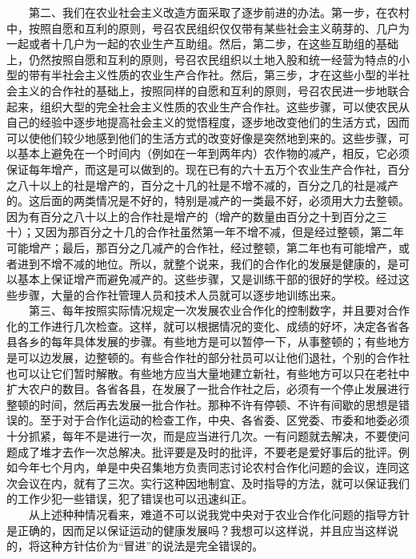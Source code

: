 \documentclass[cn,11pt,chinese]{elegantbook}
\begin{document}
　　第二、我们在农业社会主义改造方面采取了逐步前进的办法。第一步，在农村中，按照自愿和互利的原则，号召农民组织仅仅带有某些社会主义萌芽的、几户为一起或者十几户为一起的农业生产互助组。然后，第二步，在这些互助组的基础上，仍然按照自愿和互利的原则，号召农民组织以土地入股和统一经营为特点的小型的带有半社会主义性质的农业生产合作社。然后，第三步，才在这些小型的半社会主义的合作社的基础上，按照同样的自愿和互利的原则，号召农民进一步地联合起来，组织大型的完全社会主义性质的农业生产合作社。这些步骤，可以使农民从自己的经验中逐步地提高社会主义的觉悟程度，逐步地改变他们的生活方式，因而可以使他们较少地感到他们的生活方式的改变好像是突然地到来的。这些步骤，可以基本上避免在一个时间内（例如在一年到两年内）农作物的减产，相反，它必须保证每年增产，而这是可以做到的。现在已有的六十五万个农业生产合作社，百分之八十以上的社是增产的，百分之十几的社是不增不减的，百分之几的社是减产的。这后面的两类情况是不好的，特别是减产的一类最不好，必须用大力去整顿。因为有百分之八十以上的合作社是增产的（增产的数量由百分之十到百分之三十）；又因为那百分之十几的合作社虽然第一年不增不减，但是经过整顿，第二年可能增产；最后，那百分之几减产的合作社，经过整顿，第二年也有可能增产，或者进到不增不减的地位。所以，就整个说来，我们的合作化的发展是健康的，是可以基本上保证增产而避免减产的。这些步骤，又是训练干部的很好的学校。经过这些步骤，大量的合作社管理人员和技术人员就可以逐步地训练出来。\\
　　第三、每年按照实际情况规定一次发展农业合作化的控制数字，并且要对合作化的工作进行几次检查。这样，就可以根据情况的变化、成绩的好坏，决定各省各县各乡的每年具体发展的步骤。有些地方是可以暂停一下，从事整顿的；有些地方是可以边发展，边整顿的。有些合作社的部分社员可以让他们退社，个别的合作社也可以让它们暂时解散。有些地方应当大量地建立新社，有些地方可以只在老社中扩大农户的数目。各省各县，在发展了一批合作社之后，必须有一个停止发展进行整顿的时间，然后再去发展一批合作社。那种不许有停顿、不许有间歇的思想是错误的。至于对于合作化运动的检查工作，中央、各省委、区党委、市委和地委必须十分抓紧，每年不是进行一次，而是应当进行几次。一有问题就去解决，不要使问题成了堆才去作一次总解决。批评要是及时的批评，不要老是爱好事后的批评。例如今年七个月内，单是中央召集地方负责同志讨论农村合作化问题的会议，连同这次会议在内，就有了三次。实行这种因地制宜、及时指导的方法，就可以保证我们的工作少犯一些错误，犯了错误也可以迅速纠正。\\
　　从上述种种情况看来，难道不可以说我党中央对于农业合作化问题的指导方针是正确的，因而足以保证运动的健康发展吗？我想可以这样说，并且应当这样说的，将这种方针估价为“冒进”的说法是完全错误的。\\
\end{document}
